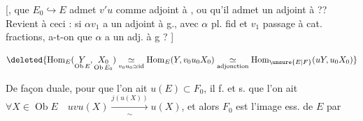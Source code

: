 [,  que $E_0\hookrightarrow E$ admet $v'u$ comme adjoint à , ou qu'il admet un adjoint à  ?? Revient à ceci : si $\alpha v_1$ a un adjoint à g., avec $\alpha$ pl. fid et $v_1$ passage à cat. fractions, a-t-on que $\alpha$ a un adj. à g ? ]

\[
\deleted{\operatorname{Hom}_{E}(\underset{\operatorname{Ob}E}{Y},\underset{\operatorname{Ob}E_0}{X_0})\underset{v_0u_0\simeq\operatorname{id}}{\simeq}\operatorname{Hom}_{E}(Y,v_0u_0X_0)\underset{\text{adjonction}}{\simeq}\operatorname{Hom}_{\unsure{E|F}}(uY,u_0X_0)}
\]

De façon duale, pour que l'on ait $u(E)\subset F_0$, il f. et s. que l'on ait  $\forall X\in\operatorname{Ob}E\quad uvu(X)\xrightarrow[\sim]{j(u(X))}u(X)$, et alors $F_0$ est l'image ess. de $E$ par


